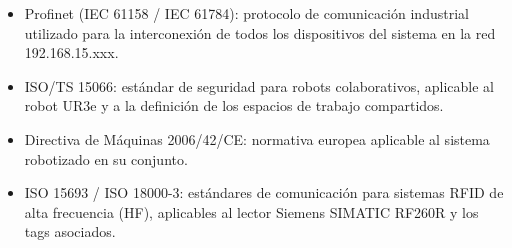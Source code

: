 \begin{itemize}
	\item Profinet (IEC 61158 / IEC 61784): protocolo de comunicación industrial utilizado para la interconexión de todos los dispositivos del sistema en la red 192.168.15.xxx.

	\item ISO/TS 15066: estándar de seguridad para robots colaborativos, aplicable al robot UR3e y a la definición de los espacios de trabajo compartidos.

	\item Directiva de Máquinas 2006/42/CE: normativa europea aplicable al sistema robotizado en su conjunto.

	\item ISO 15693 / ISO 18000-3: estándares de comunicación para sistemas RFID de alta frecuencia (HF), aplicables al lector Siemens SIMATIC RF260R y los tags asociados.
\end{itemize}
